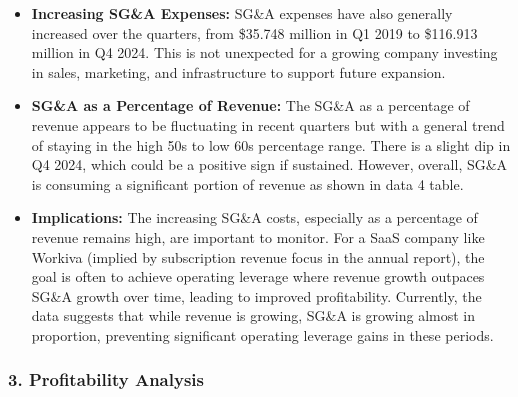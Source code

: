 \documentclass[
  10pt,
  a4paper,
]{article}
\providecommand{\tightlist}{%
  \setlength{\itemsep}{0pt}\setlength{\parskip}{0pt}}\usepackage{longtable,booktabs,array}
\begin{document}
\begin{itemize}
\tightlist
\item
  \textbf{Increasing SG\&A Expenses:} SG\&A expenses have also generally
  increased over the quarters, from \$35.748 million in Q1 2019 to
  \$116.913 million in Q4 2024. This is not unexpected for a growing
  company investing in sales, marketing, and infrastructure to support
  future expansion.
\item
  \textbf{SG\&A as a Percentage of Revenue:} The SG\&A as a percentage
  of revenue appears to be fluctuating in recent quarters but with a
  general trend of staying in the high 50s to low 60s percentage range.
  There is a slight dip in Q4 2024, which could be a positive sign if
  sustained. However, overall, SG\&A is consuming a significant portion
  of revenue as shown in data 4 table.
\item
  \textbf{Implications:} The increasing SG\&A costs, especially as a
  percentage of revenue remains high, are important to monitor. For a
  SaaS company like Workiva (implied by subscription revenue focus in
  the annual report), the goal is often to achieve operating leverage
  where revenue growth outpaces SG\&A growth over time, leading to
  improved profitability. Currently, the data suggests that while
  revenue is growing, SG\&A is growing almost in proportion, preventing
  significant operating leverage gains in these periods.
\end{itemize}

\subsubsection{3. Profitability Analysis}\label{profitability-analysis}
\end{document}
